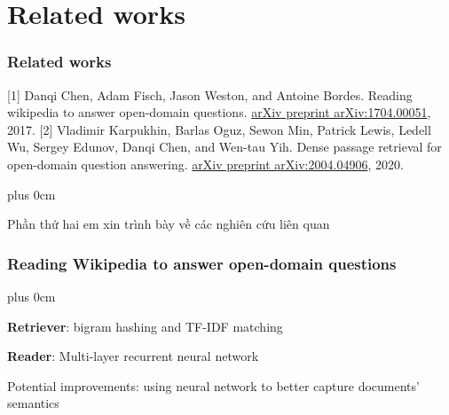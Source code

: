 \documentclass[11pt]{beamer}
\renewcommand{\raggedright}{\leftskip=0pt \rightskip=0pt plus 0cm}
\let\olditemize=\itemize
\renewenvironment{itemize}{\olditemize\raggedright}{\endlist}
\begin{document}
\section{Related works}
\begin{frame}
	\frametitle{Related works}
	\begin{thebibliography}{10}
		[1] Danqi Chen, Adam Fisch, Jason Weston, and Antoine Bordes. Reading wikipedia to answer open-domain questions. \underline{arXiv preprint arXiv:1704.00051}, 2017.
		[2] Vladimir Karpukhin, Barlas Oguz, Sewon Min, Patrick Lewis, Ledell Wu, Sergey Edunov, Danqi Chen, and Wen-tau Yih. Dense passage retrieval for open-domain	question answering. \underline{arXiv preprint arXiv:2004.04906}, 2020.
	\end{thebibliography}
\end{frame}
\begin{frame}
	\begin{itemize}
		\item Phần thứ hai em xin trình bày về các nghiên cứu liên quan
	\end{itemize}
\end{frame}
\begin{frame}
	\frametitle{Reading Wikipedia to answer open-domain questions}
	\begin{itemize}
		\item \textbf{Retriever}: bigram hashing and TF-IDF matching
		\item \textbf{Reader}: Multi-layer recurrent neural network
		\item Potential improvements: using neural network to better capture documents' semantics
	\end{itemize}
\end{frame}
\end{document}

